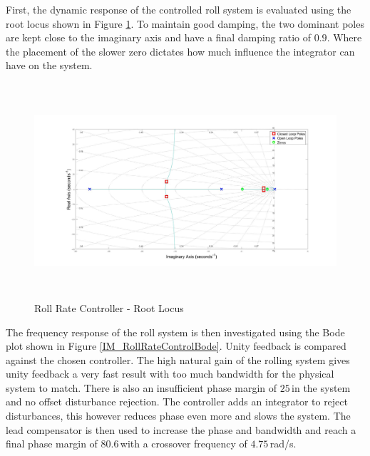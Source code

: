 	First, the dynamic response of the controlled roll system is evaluated using the root locus shown in Figure \ref{IM_RollRateControlRoot}. To maintain good damping, the two dominant poles are kept close to the imaginary axis and have a final damping ratio of $0.9$. Where the placement of the slower zero dictates how much influence the integrator can have on the system. 
	
	\begin{figure}[H]
		\centering
		\includegraphics[height = 8cm]{../Design/Matlab/Controllers/roll_rate_root.jpg}
		\caption{Roll Rate Controller -  Root Locus}
		\label{IM_RollRateControlRoot}
	\end{figure}
	
	The frequency response of the roll system is then investigated using the Bode plot shown in Figure \ref{IM_RollRateControlBode}. Unity feedback is compared against the chosen controller. The high natural gain of the rolling system gives unity feedback a very fast result with too much bandwidth for the physical system to match. There is also an insufficient phase margin of $25$\textdegree\,in the system and no offset disturbance rejection. The controller adds an integrator to reject disturbances, this however reduces phase even more and slows the system. The lead compensator is then used to increase the phase and bandwidth and reach a final phase margin of $80.6$\textdegree\,with a crossover frequency of $4.75$\,rad/s.
	
